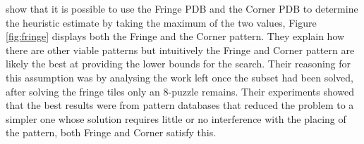 \documentclass[final]{cmpreport}
\begin{document}
\cite{culberson1998pattern} show that it is possible to use the Fringe PDB and the Corner PDB to determine the heuristic estimate by taking the maximum of the two values, Figure \ref{fig:fringe} displays both the Fringe and the Corner pattern. They explain how there are other viable patterns but intuitively the Fringe and Corner pattern are likely the best at providing the lower bounds for the search. Their reasoning for this assumption was by analysing the work left once the subset had been solved, after solving the fringe tiles only an 8-puzzle remains. Their experiments showed that the best results were from pattern databases that reduced the problem to a simpler one whose solution requires little or no interference with the placing of the pattern, both Fringe and Corner satisfy this.
\end{document}
